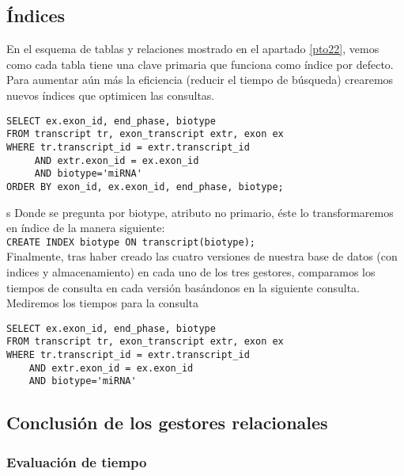 \documentclass[12pt,a4paper]{article}
\begin{document}

\subsection{Índices}  \label{pto32}

En el esquema de tablas y relaciones mostrado en el apartado \ref{pto22}, vemos como cada tabla tiene una clave primaria que funciona como índice por defecto. Para aumentar aún más la eficiencia (reducir el tiempo de búsqueda) crearemos nuevos índices que optimicen las consultas. 


\begin{verbatim}
SELECT ex.exon_id, end_phase, biotype
FROM transcript tr, exon_transcript extr, exon ex
WHERE tr.transcript_id = extr.transcript_id 
     AND extr.exon_id = ex.exon_id 
     AND biotype='miRNA'
ORDER BY exon_id, ex.exon_id, end_phase, biotype;
\end{verbatim}
s
Donde se pregunta por biotype, atributo no primario, éste lo transformaremos en índice de la manera siguiente:\\

\verb|CREATE INDEX biotype ON transcript(biotype);|\\



Finalmente, tras haber creado las cuatro versiones de nuestra base de datos (con indices y almacenamiento) en cada  uno de los tres gestores, comparamos los tiempos de consulta en cada versión basándonos en la siguiente consulta. Mediremos los tiempos para la consulta

\begin{verbatim}
SELECT ex.exon_id, end_phase, biotype
FROM transcript tr, exon_transcript extr, exon ex
WHERE tr.transcript_id = extr.transcript_id 
    AND extr.exon_id = ex.exon_id 
    AND biotype='miRNA'
\end{verbatim}

\subsection {Conclusión de los gestores relacionales} \label{pto33}
\subsubsection{Evaluación de tiempo} \label{pto331}
\end{document}

